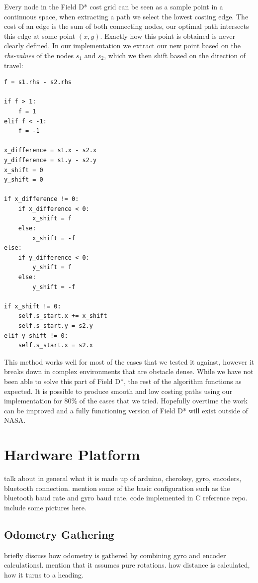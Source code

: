 \noindent
Every node in the Field D* cost grid can be seen as a sample point in a continuous space, when extracting a path we select the lowest costing edge. The cost of an edge is the sum of both connecting nodes, our optimal path intersects this edge at some point $(x, y)$. Exactly how this point is obtained is never clearly defined. In our implementation we extract our new point based on the \textit{rhs-values} of the nodes $s_{1}$ and $s_{2}$, which we then shift based on the direction of travel: \\

\begin{lstlisting}
f = s1.rhs - s2.rhs

if f > 1:
	f = 1
elif f < -1:
	f = -1

x_difference = s1.x - s2.x
y_difference = s1.y - s2.y
x_shift = 0
y_shift = 0

if x_difference != 0:
	if x_difference < 0:
		x_shift = f
	else:
		x_shift = -f
else:
	if y_difference < 0:
		y_shift = f
	else:
		y_shift = -f

if x_shift != 0:
	self.s_start.x += x_shift
	self.s_start.y = s2.y
elif y_shift != 0:
	self.s_start.x = s2.x
\end{lstlisting}

\noindent
This method works well for most of the cases that we tested it against, however it breaks down in complex environments that are obstacle dense. While we have not been able to solve this part of Field D*, the rest of the algorithm functions as expected. It is possible to produce smooth and low costing paths using our implementation for 80\% of the cases that we tried. Hopefully overtime the work can be improved and a fully functioning version of Field D* will exist outside of NASA.

\section{Hardware Platform}
talk about in general what it is made up of arduino, cherokey, gyro, encoders, bluetooth connection. mention some of the basic configuration such as the bluetooth baud rate and gyro baud rate. code implemented in C reference repo. include some pictures here. 

\subsection{Odometry Gathering}
briefly discuss how odometry is gathered by combining gyro and encoder calculationsl. mention that it assumes pure rotations. how distance is calculated, how it turns to a heading.

